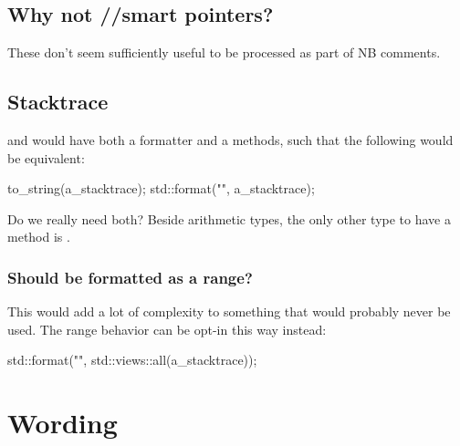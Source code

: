 \documentclass{wg21}
\begin{document}
\subsection{Why not //smart pointers?}

These don't seem sufficiently useful to be processed as part of NB comments.

\subsection{Stacktrace}

 and  would have both a formatter and a  methods,
such that the following would be equivalent:

\begin{colorblock}
to_string(a_stacktrace);
std::format("{}", a_stacktrace);
\end{colorblock}

Do we really need both?
Beside arithmetic types, the only other type to have a  method is .

\subsubsection{Should  be formatted as a range?}

This would add a lot of complexity to something that would probably never be used.
The range behavior can be opt-in this way instead:

\begin{colorblock}
std::format("{}", std::views::all(a_stacktrace));
\end{colorblock}

\section{Wording}
\end{document}
